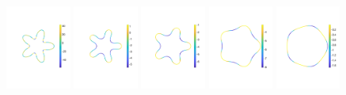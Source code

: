 \documentclass[aps,prl,showpacs]{revtex4}
\begin{document}
\begin{figure}[htp]
  \centering
  \includegraphics[width=0.19\textwidth,trim =2cm 5cm 0cm 5cm, clip=true]{figures/StarTensionTime1.pdf}
  \includegraphics[width=0.19\textwidth,trim =2cm 5cm 0cm 5cm, clip=true]{figures/StarTensionTime2.pdf}
  \includegraphics[width=0.19\textwidth,trim =2cm 5cm 0cm 5cm, clip=true]{figures/StarTensionTime3.pdf}
  \includegraphics[width=0.19\textwidth,trim =2cm 5cm 0cm 5cm, clip=true]{figures/StarTensionTime4.pdf}
  \includegraphics[width=0.19\textwidth,trim =2cm 5cm 0cm 5cm,clip=true]{figures/StarTensionTime5.pdf}


\end{figure}
\end{document}
